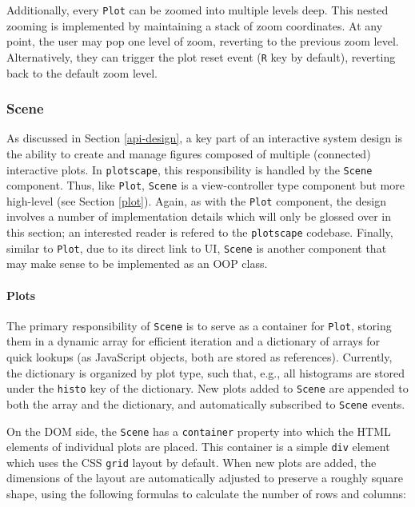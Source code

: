 \documentclass[
  openany]{book}
\theoremstyle{definition}
\theoremstyle{definition}
\theoremstyle{definition}
\theoremstyle{definition}
\theoremstyle{remark}
\begin{document}
Additionally, every \texttt{Plot} can be zoomed into multiple levels deep. This nested zooming is implemented by maintaining a stack of zoom coordinates. At any point, the user may pop one level of zoom, reverting to the previous zoom level. Alternatively, they can trigger the plot reset event (\texttt{R} key by default), reverting back to the default zoom level.

\subsubsection{Scene}\label{scene}

As discussed in Section \ref{api-design}, a key part of an interactive system design is the ability to create and manage figures composed of multiple (connected) interactive plots. In \texttt{plotscape}, this responsibility is handled by the \texttt{Scene} component. Thus, like \texttt{Plot}, \texttt{Scene} is a view-controller type component but more high-level (see Section \ref{plot}). Again, as with the \texttt{Plot} component, the design involves a number of implementation details which will only be glossed over in this section; an interested reader is refered to the \texttt{plotscape} codebase. Finally, similar to \texttt{Plot}, due to its direct link to UI, \texttt{Scene} is another component that may make sense to be implemented as an OOP class.

\paragraph{Plots}\label{plots}

The primary responsibility of \texttt{Scene} is to serve as a container for \texttt{Plot}, storing them in a dynamic array for efficient iteration and a dictionary of arrays for quick lookups (as JavaScript objects, both are stored as references). Currently, the dictionary is organized by plot type, such that, e.g., all histograms are stored under the \texttt{histo} key of the dictionary. New plots added to \texttt{Scene} are appended to both the array and the dictionary, and automatically subscribed to \texttt{Scene} events.

On the DOM side, the \texttt{Scene} has a \texttt{container} property into which the HTML elements of individual plots are placed. This container is a simple \texttt{div} element which uses the CSS \texttt{grid} layout by default. When new plots are added, the dimensions of the layout are automatically adjusted to preserve a roughly square shape, using the following formulas to calculate the number of rows and columns:
\end{document}
